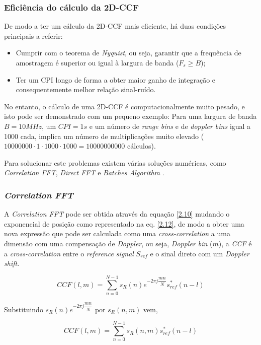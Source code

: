 \subsubsection*{Eficiência do cálculo da \gls{2D-CCF}}
De modo a ter um cálculo da \gls{2D-CCF} mais eficiente, há duas condições principais a referir:
\begin{itemize}
\item Cumprir com o teorema de \textit{Nyquist}, ou seja, garantir que a frequência de amostragem é superior ou igual à largura de banda ($F_{s}\geq B$); 
\item Ter um \gls{CPI} longo de forma a obter maior ganho de integração e consequentemente melhor relação sinal-ruído.
\end{itemize}
\par
No entanto, o cálculo de uma \gls{2D-CCF} é computacionalmente muito pesado, e isto pode ser demonstrado com um pequeno exemplo: Para uma largura de banda $B=10MHz$, um $CPI=1s$ e um número de \textit{range bins} e de \textit{doppler bins} igual a 1000 cada, implica um número de multiplicações muito elevado ($10000000\cdot 1\cdot 1000\cdot 1000=10000000000$ cálculos).\par
Para solucionar este problemas existem várias soluções numéricas, como \textit{Correlation FFT}, \textit{Direct FFT} e \textit{Batches Algorithm} \parencite{Martorella}.

\subsubsection*{\textit{Correlation FFT}}
A \textit{Correlation FFT} pode ser obtida através da equação \ref{2.10} mudando o exponencial de posição como representado na eq. \ref{2.12}, de modo a obter uma nova expressão que pode ser calculada como uma \textit{cross-correlation} a uma dimensão com uma compensação de \textit{Doppler}, ou seja, \textit{Doppler bin} ($m$), a \textit{\gls{CCF}} é a \textit{cross-correlation} entre o \textit{reference signal} $S_{ref}$ e o sinal direto com um \textit{Doppler shift}.

\begin{equation} \label{2.12}
CCF\left(l,m\right) =\sum_{n=0}^{N-1} s_{R}\left( n\right)e^{-2\pi j\dfrac{mn}{N}}s_{ref}^{\ast}\left(n -l\right)
\end{equation}

Substituindo $s_{R}\left( n\right)e^{-2\pi j\dfrac{mn}{N}}$ por $s_{R}(n,m)$ vem,

\begin{equation} \label{2.13}
CCF\left(l,m\right) =\sum_{n=0}^{N-1} s_{R}\left( n,m\right) s_{ref}^{\ast}\left(n -l\right)
\end{equation}

